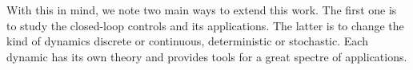     With this in mind, we note two main ways to extend this work. The first one is 
    to study the closed-loop controls and its applications. The latter is to 
    change the kind of dynamics \textemdash discrete or continuous, deterministic 
    or stochastic. Each dynamic has its own theory and provides tools for a 
    great spectre of applications.

